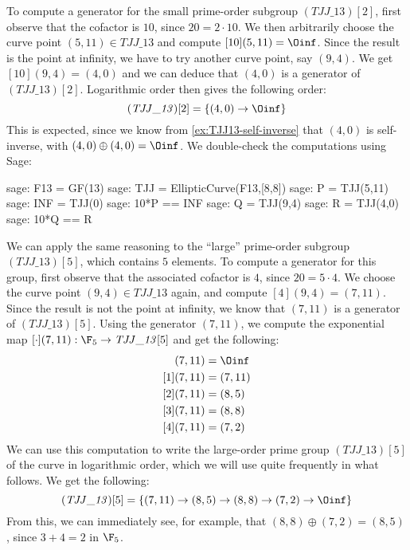 \begin{example}
To compute a generator for the small prime-order subgroup $(\mathit{TJJ\_13})[2]$, first observe that the cofactor is $10$, since $20=2\cdot 10$. We then arbitrarily choose the curve point $(5,11)\in \mathit{TJJ\_13}$ and compute $[10](5,11)=\Oinf$. Since the result is the point at infinity, we have to try another curve point, say $(9,4)$. We get $[10](9,4)=(4,0)$ and we can deduce that $(4,0)$ is a generator of $(\mathit{TJJ\_13})[2]$. Logarithmic order then gives the following order:
\begin{equation}
(\mathit{TJJ\_13})[2] = \{(4,0)\to \Oinf\}
\end{equation}
This is expected, since we know from \examplename{} \ref{ex:TJJ13-self-inverse} that $(4,0)$ is self-inverse, with $(4,0)\oplus (4,0)=\Oinf$. We double-check the computations using Sage: 
\begin{sagecommandline}
sage: F13 = GF(13)
sage: TJJ = EllipticCurve(F13,[8,8])
sage: P = TJJ(5,11)
sage: INF = TJJ(0)
sage: 10*P == INF
sage: Q = TJJ(9,4)
sage: R = TJJ(4,0)
sage: 10*Q == R
\end{sagecommandline}
We can apply the same reasoning to the ``large'' prime-order subgroup $(\mathit{TJJ\_13})[5]$, which contains $5$ elements. To compute a generator for this group, first observe that the associated cofactor is $4$, since $20=5\cdot 4$. We choose the curve point $(9,4)\in \mathit{TJJ\_13}$ again, and compute $[4](9,4)=(7,11)$. Since the result is not the point at infinity, we know that $(7,11)$ is a generator of $(\mathit{TJJ\_13})[5]$. Using the generator $(7,11)$, we compute the exponential map $[\cdot](7,11): \F_5 \to \mathit{TJJ\_13}[5]$ and get the following:
\begin{align*}
[0](7,11) &= \Oinf\\
[1](7,11) &= (7,11)\\
[2](7,11) &= (8,5)\\
[3](7,11) &= (8,8)\\
[4](7,11) &= (7,2)
\end{align*}
We can use this computation to write the large-order prime group $(\mathit{TJJ\_13})[5]$ of the  curve in logarithmic order, which we will use quite frequently in what follows. We get the following:
\begin{equation}\label{eq:TJJ13-logarithmic-order}
(\mathit{TJJ\_13})[5] = \{(7,11)\to(8,5)\to(8,8)\to(7,2)\to \Oinf\}
\end{equation}
From this, we can immediately see, for example, that  $(8,8)\oplus (7,2)= (8,5)$, since 
$3+4=2$ in $\F_5$.
\end{example}
